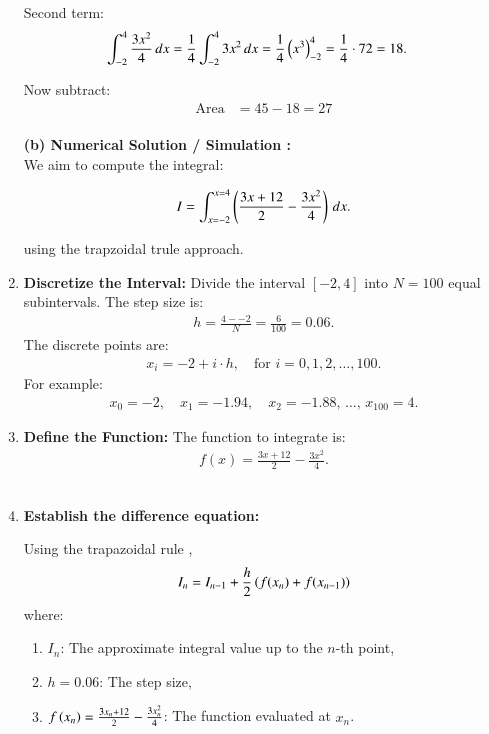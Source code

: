 \documentclass[journal]{IEEEtran}
\begin{document}
\begin{enumerate}
    Second term:
    \begin{align}
        \int_{-2}^{4} \frac{3x^2}{4} \, dx &= \frac{1}{4} \int_{-2}^{4} 3x^2 \, dx = \frac{1}{4} \left( x^3 \right)_{-2}^{4} = \frac{1}{4} \cdot 72 = 18.
    \end{align}

    Now subtract:
    \begin{align}
        \text{Area} &= 45 -18 = 27
    \end{align} \\
    
\textbf{(b) Numerical Solution / Simulation : } \\

We aim to compute the integral:

\[
I = \int_{x=-2}^{x=4} \left( \frac{3x+12}{2} - \frac{3x^2}{4} \right) \, dx.
\]

using the trapzoidal trule approach. \\

    \item \textbf{Discretize the Interval:}  
    Divide the interval $[-2, 4]$ into $N = 100$ equal subintervals. The step size is:
    \begin{align}
    h = \frac{4 - -2}{N} = \frac{6}{100} = 0.06.
    \end{align}
    The discrete points are:
    \begin{align}
    x_i = -2 + i \cdot h, \quad \text{for } i = 0, 1, 2, \dots, 100.
    \end{align}
    For example:
    \begin{align}
    x_0 = -2, \quad x_1 = -1.94, \quad x_2 = -1.88, \, \dots, \, x_{100} = 4.
    \end{align}

    \item \textbf{Define the Function:}  
    The function to integrate is:
    \begin{align}
    f(x) = \frac{3x+12}{2} - \frac{3x^2}{4}.
    \end{align} \\

    \item \textbf{Establish the difference equation:} 
    
    Using the trapazoidal rule , 
    \begin{align}
    I_{n} = I_{n-1} + \frac{h}{2} \left( f(x_n) + f(x_{n-1})\right) 
      \end{align}
    where:
    \begin{enumerate}
        \item $I_n$: The approximate integral value up to the $n$-th point,
        \item $h = 0.06$: The step size,
        \item $f\left(x_n\right) = \frac{3x_n+12}{2} - \frac{3x_n^2}{4}$: The function evaluated at $x_n$. \\
    \end{enumerate} 
   

\end{enumerate}
\end{document}
